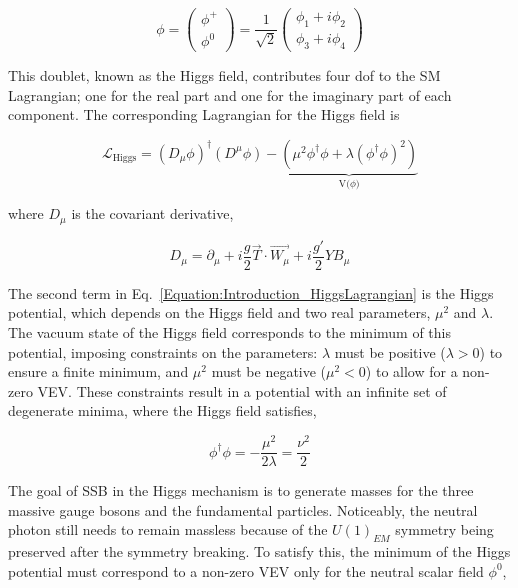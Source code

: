 \[
\phi =
\begin{pmatrix}
\phi^{+} \\
\phi^{0} 
\end{pmatrix}
= \frac{1}{\sqrt{2}} \begin{pmatrix}
    \phi_{1} + i\phi_{2} \\
    \phi_{3} + i\phi_{4}
\end{pmatrix}
\]

This doublet, known as the Higgs field, contributes four \ac{dof} to the SM Lagrangian; one for the real part and one for the imaginary part of each component. The corresponding Lagrangian for the Higgs field is

\begin{equation}
    \mathcal{L}_{\text{Higgs}} = (D_{\mu} \phi)^{\dagger}(D^{\mu}\phi) - \underbrace{(\mu^{2}\phi^{\dagger}\phi + \lambda(\phi^{\dagger}\phi)^2)}_{\text{V($\phi$)}}
\label{Equation:Introduction_HiggsLagrangian}
\end{equation}

where $D_{\mu}$ is the covariant derivative,

\begin{equation}
    D_{\mu} = \partial_{\mu} + i\frac{g}{2}\vec{T}\cdot\vec{W_{\mu}} + i\frac{g'}{2}YB_{\mu}
\end{equation}

The second term in Eq.~\ref{Equation:Introduction_HiggsLagrangian} is the Higgs potential, which depends on the Higgs field and two real parameters, $\mu^{2}$ and $\lambda$. The vacuum state of the Higgs field corresponds to the minimum of this potential, imposing constraints on the parameters: $\lambda$ must be positive ($\lambda > 0$) to ensure a finite minimum, and $\mu^{2}$ must be negative ($\mu^{2} < 0$) to allow for a non-zero VEV. These constraints result in a potential with an infinite set of degenerate minima, where the Higgs field satisfies,

\begin{equation}
    \phi^{\dagger}\phi = -\frac{\mu^{2}}{2\lambda} = \frac{\nu^2}{2}
\end{equation}

The goal of SSB in the Higgs mechanism is to generate masses for the three massive gauge bosons and the fundamental particles.  Noticeably, the neutral photon still needs to remain massless because of the $U(1)_{EM}$ symmetry being preserved after the symmetry breaking. To satisfy this, the minimum of the Higgs potential must correspond to a non-zero VEV only for the neutral scalar field $\phi^{0}$,

